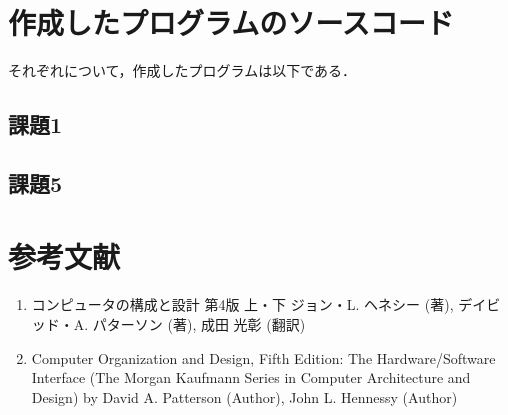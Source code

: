 \documentclass[a4j]{jarticle}
\begin{document}
\section{作成したプログラムのソースコード}

それぞれについて，作成したプログラムは以下である．

\subsection{課題1}






\subsection{課題5}





%
%

\section{参考文献}

\begin{enumerate}
\item コンピュータの構成と設計 第4版 上・下 ジョン・L. ヘネシー (著), デイビッド・A. パターソン (著), 成田 光彰 (翻訳)
\item Computer Organization and Design, Fifth Edition: The Hardware/Software Interface (The Morgan Kaufmann Series in Computer Architecture and Design) by David A. Patterson (Author), John L. Hennessy  (Author)
\end{enumerate}
\end{document}
